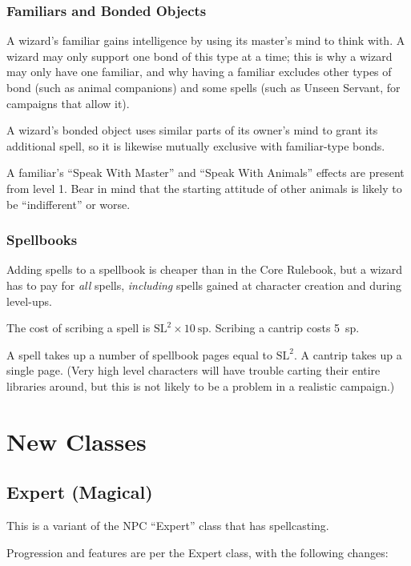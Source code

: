 \subsubsection{Familiars and Bonded Objects}

A wizard's familiar gains intelligence by using its master's mind to think
with. A wizard may only support one bond of this type at a time; this is
why a wizard may only have one familiar, and why having a familiar excludes
other types of bond (such as animal companions) and some spells (such as
Unseen Servant, for campaigns that allow it).

A wizard's bonded object uses similar parts of its owner's mind to grant
its additional spell, so it is likewise mutually exclusive with familiar-type
bonds.

A familiar's ``Speak With Master'' and ``Speak With Animals'' effects are
present from level 1. Bear in mind that the starting attitude of other
animals is likely to be ``indifferent'' or worse.

\subsubsection{Spellbooks}

Adding spells to a spellbook is cheaper than in the Core Rulebook, but a
wizard has to pay for \textit{all} spells, \textit{including} spells gained
at character creation and during level-ups.

The cost of scribing a spell is $\mathrm{SL}^2 \times 10~\mathrm{sp}$.
Scribing a cantrip costs 5~sp.

A spell takes up a number of spellbook pages equal to $\mathrm{SL}^2$.
A cantrip takes up a single page. (Very high level characters will have
trouble carting their entire libraries around, but this is not likely to
be a problem in a realistic campaign.)
%

%
%
\section{New Classes}

%
\subsection{Expert (Magical)}

This is a variant of the NPC ``Expert'' class that has spellcasting.

Progression and features are per the Expert class, with the following
changes:

